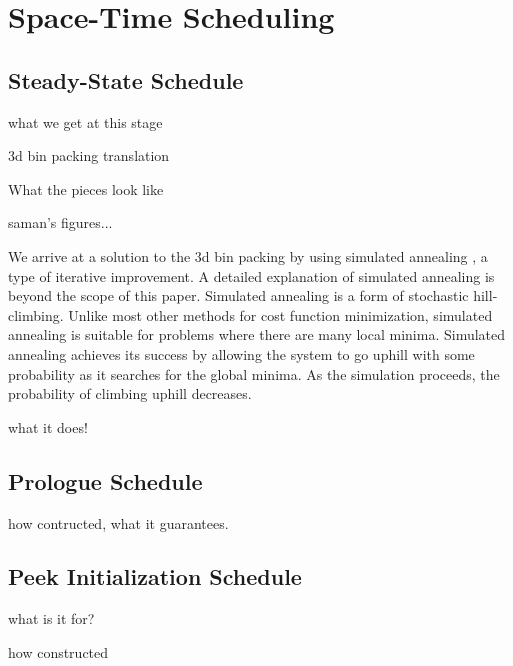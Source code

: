 \section{Space-Time Scheduling}
\label{sec:scheduling}
\subsection{Steady-State Schedule}
what we get at this stage

3d bin packing translation

What the pieces look like 

saman's figures...

We arrive at a solution to the 3d bin packing by using simulated
annealing \cite{simanneal}, a type of iterative improvement.  A
detailed explanation of simulated annealing is beyond the scope of
this paper.  Simulated annealing is a form of stochastic
hill-climbing. Unlike most other methods for cost function
minimization, simulated annealing is suitable for problems where there
are many local minima.  Simulated annealing achieves its success by
allowing the system to go uphill with some probability as it searches
for the global minima.  As the simulation proceeds, the probability of
climbing uphill decreases.


what it does!

\subsection{Prologue Schedule}
how contructed, what it guarantees.

\subsection{Peek Initialization Schedule}
what is it for?

how constructed



